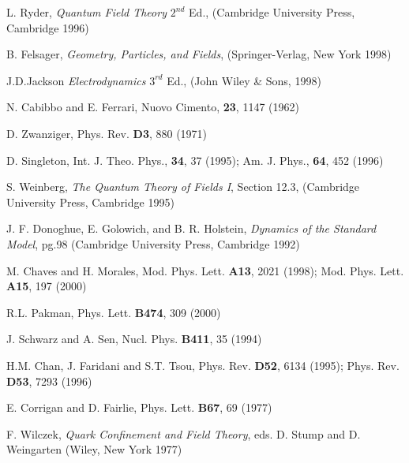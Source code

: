 \documentclass[a4paper,aps]{revtex4}
\begin{document}
\begin{thebibliography}{}

 L. Ryder, {\it Quantum Field Theory} $2^{nd}$ Ed.,
(Cambridge University Press, Cambridge 1996)

 B. Felsager, {\it Geometry, Particles, and Fields},
(Springer-Verlag, New York 1998)

 J.D.Jackson {\it Electrodynamics} $3^{rd}$ Ed.,
(John Wiley \& Sons, 1998)

 N. Cabibbo and E. Ferrari, Nuovo Cimento, {\bf 23},
1147 (1962)

 D. Zwanziger, Phys. Rev. {\bf D3}, 880 (1971)

 D. Singleton, Int. J. Theo. Phys., {\bf 34},
37 (1995); Am. J. Phys., {\bf 64}, 452 (1996)

 S. Weinberg, {\it The Quantum Theory of Fields I},
Section 12.3, (Cambridge University Press, Cambridge 1995)

 J. F. Donoghue, E. Golowich, and B. R. Holstein,
{\it Dynamics of the Standard Model}, pg.98 (Cambridge University
Press, Cambridge 1992)

 M. Chaves and H. Morales, Mod. Phys. Lett. {\bf A13},
2021 (1998); Mod. Phys. Lett. {\bf A15}, 197 (2000)

 R.L. Pakman, Phys. Lett.  {\bf B474}, 309 (2000)

 J. Schwarz and A. Sen, Nucl. Phys. {\bf B411}, 35 (1994)

 H.M. Chan, J. Faridani and S.T. Tsou, Phys. Rev. {\bf D52},
6134 (1995); Phys. Rev. {\bf D53}, 7293 (1996)

 E. Corrigan and D. Fairlie, Phys. Lett. {\bf B67}, 69
(1977)

 F. Wilczek, {\it Quark Confinement and Field Theory},
eds. D. Stump and D. Weingarten (Wiley, New York 1977)

\end{thebibliography}
\end{document}
